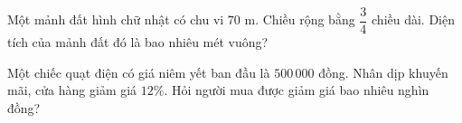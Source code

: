 \begin{ex} %
Một mảnh đất hình chữ nhật có chu vi $70\text{ m}$. Chiều rộng bằng $\dfrac{3}{4}$ chiều dài. Diện tích của mảnh đất đó là bao nhiêu mét vuông?
\end{ex}

\begin{ex} %
Một chiếc quạt điện có giá niêm yết ban đầu là $500\,000$ đồng. Nhân dịp khuyến mãi, cửa hàng giảm giá $12\%$. Hỏi người mua được giảm giá bao nhiêu nghìn đồng?
\end{ex}
